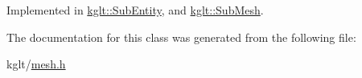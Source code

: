 Implemented in \hyperlink{classkglt_1_1_sub_entity_aea6499bbcf0d0be122a9772e4c550979}{kglt\-::\-Sub\-Entity}, and \hyperlink{classkglt_1_1_sub_mesh_a471e8698ec355fa8b743e27b779ba687}{kglt\-::\-Sub\-Mesh}.



The documentation for this class was generated from the following file\-:\begin{DoxyCompactItemize}
\item 
kglt/\hyperlink{mesh_8h}{mesh.\-h}\end{DoxyCompactItemize}
